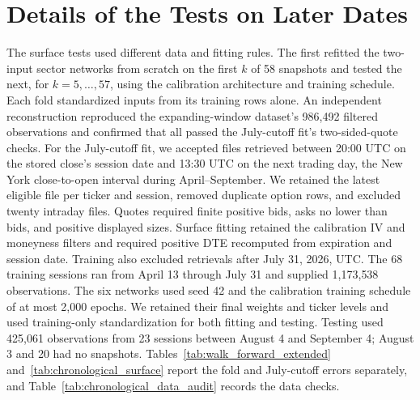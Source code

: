 \section{Details of the Tests on Later Dates}\label{sec:chronological_supp}

The surface tests used different data and fitting rules. The first refitted the two-input sector networks from scratch on the first $k$ of 58 snapshots and tested the next, for $k=5,\ldots,57$, using the calibration architecture and training schedule. Each fold standardized inputs from its training rows alone. An independent reconstruction reproduced the expanding-window dataset's 986{,}492 filtered observations and confirmed that all passed the July-cutoff fit's two-sided-quote checks. For the July-cutoff fit, we accepted files retrieved between 20:00 UTC on the stored close's session date and 13:30 UTC on the next trading day, the New York close-to-open interval during April--September. We retained the latest eligible file per ticker and session, removed duplicate option rows, and excluded twenty intraday files. Quotes required finite positive bids, asks no lower than bids, and positive displayed sizes. Surface fitting retained the calibration IV and moneyness filters and required positive DTE recomputed from expiration and session date. Training also excluded retrievals after July 31, 2026, UTC. The 68 training sessions ran from April 13 through July 31 and supplied 1{,}173{,}538 observations. The six networks used seed 42 and the calibration training schedule of at most 2{,}000 epochs. We retained their final weights and ticker levels and used training-only standardization for both fitting and testing. Testing used 425{,}061 observations from 23 sessions between August 4 and September 4; August 3 and 20 had no snapshots. Tables~\ref{tab:walk_forward_extended} and~\ref{tab:chronological_surface} report the fold and July-cutoff errors separately, and Table~\ref{tab:chronological_data_audit} records the data checks.

\begin{table}[H]
\centering
\caption{Next-date IV errors of the sector surfaces across the 53 expanding-window folds, by test month. Each fold fitted earlier capture dates and evaluated the next captured date using its observed stock price. The RMSE is in volatility percentage points. Median, minimum, and maximum are taken across the folds in each month. The last row summarizes the RMSEs of all 53 folds.}\label{tab:walk_forward_extended}

\end{table}

